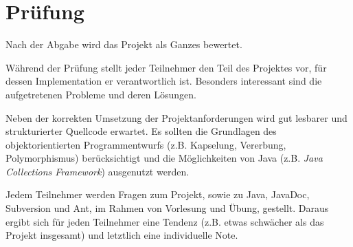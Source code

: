 \section*{Prüfung}
Nach der Abgabe wird das Projekt als Ganzes bewertet.

Während der Prüfung stellt jeder Teilnehmer den Teil des Projektes vor, für dessen Implementation er verantwortlich ist. Besonders interessant sind die aufgetretenen Probleme und deren Lösungen.

Neben der korrekten Umsetzung der Projektanforderungen wird gut lesbarer und strukturierter Quellcode erwartet. Es sollten die Grundlagen des objektorientierten Programmentwurfs (z.B. Kapselung, Vererbung, Polymorphismus) berücksichtigt und die Möglichkeiten von Java (z.B. \emph{Java Collections Framework}) ausgenutzt werden.

Jedem Teilnehmer werden Fragen zum Projekt, sowie zu Java, JavaDoc, Subversion und Ant, im Rahmen von Vorlesung und Übung, gestellt. Daraus ergibt sich für jeden Teilnehmer eine Tendenz (z.B. etwas schwächer als das Projekt insgesamt) und letztlich eine individuelle Note.
